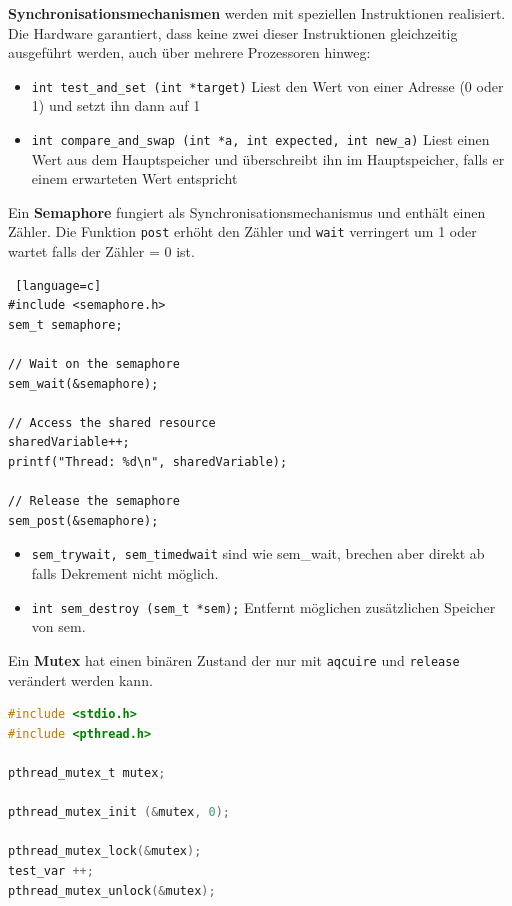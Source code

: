 \documentclass[8pt]{extarticle}
\let\oldtextbf\textbf
\renewcommand{\textbf}{\tiny\oldtextbf}
\begin{document}
\begin{multicols*}{5}
	\textbf{Synchronisationsmechanismen} werden mit speziellen Instruktionen realisiert. Die Hardware garantiert, dass keine zwei dieser Instruktionen gleichzeitig ausgeführt werden, auch über mehrere Prozessoren hinweg:
	\begin{itemize} [noitemsep, topsep=0pt, leftmargin=*]
		\item \texttt{int test\_and\_set (int *target)} Liest den Wert von einer Adresse (0 oder 1) und setzt ihn dann auf 1
		\item \texttt{int compare\_and\_swap (int *a, int expected, int new\_a)} Liest einen Wert aus dem Hauptspeicher und überschreibt ihn im Hauptspeicher, falls er einem erwarteten Wert entspricht
	\end{itemize}
	\vspace{5pt}
	Ein \textbf{Semaphore} fungiert als Synchronisationsmechanismus und enthält einen Zähler. Die Funktion \texttt{post} erhöht den Zähler und \texttt{wait} verringert um 1 oder wartet falls der Zähler = 0 ist.
	\begin{lstlisting} [language=c]
#include <semaphore.h>
sem_t semaphore;

// Wait on the semaphore
sem_wait(&semaphore);

// Access the shared resource
sharedVariable++;
printf("Thread: %d\n", sharedVariable);

// Release the semaphore
sem_post(&semaphore);
	\end{lstlisting}
	\begin{itemize} [noitemsep, topsep=0pt, leftmargin=*]
		\item \texttt{sem\_trywait, sem\_timedwait} sind wie sem\_wait, brechen aber direkt ab falls Dekrement nicht möglich.
		\item \texttt{int sem\_destroy (sem\_t *sem);} Entfernt möglichen zusätzlichen Speicher von sem.
	\end{itemize}
	\vspace{5pt}
	
	Ein \textbf{Mutex} hat einen binären Zustand der nur mit \texttt{aqcuire} und \texttt{release} verändert werden kann.
	\begin{lstlisting}[language=c]
#include <stdio.h>
#include <pthread.h>

pthread_mutex_t mutex;

pthread_mutex_init (&mutex, 0);

pthread_mutex_lock(&mutex);
test_var ++;
pthread_mutex_unlock(&mutex);
	\end{lstlisting}
	\vspace{5pt}
	

\end{multicols*}
\end{document}
